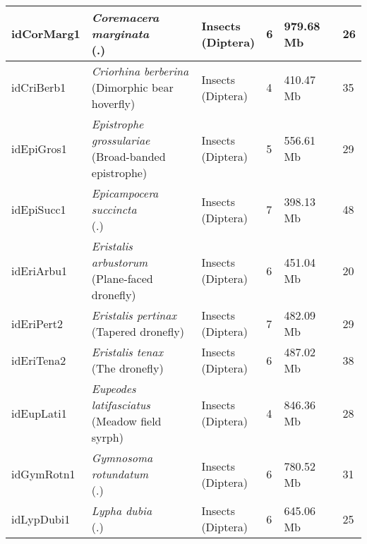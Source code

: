 \begin{centering}
\begin{longtable}{l|l|l|l|l|l}
idCorMarg1 & \makecell[{l}]{\textit{Coremacera marginata} \\ (.)} & \makecell[{l}]{Insects \\ (Diptera)} & 6 & 979.68 Mb & 26  \\ \hline
idCriBerb1 & \makecell[{l}]{\textit{Criorhina berberina} \\ (Dimorphic bear hoverfly)} & \makecell[{l}]{Insects \\ (Diptera)} & 4 & 410.47 Mb & 35  \\ \hline
idEpiGros1 & \makecell[{l}]{\textit{Epistrophe grossulariae} \\ (Broad-banded epistrophe)} & \makecell[{l}]{Insects \\ (Diptera)} & 5 & 556.61 Mb & 29  \\ \hline
idEpiSucc1 & \makecell[{l}]{\textit{Epicampocera succincta} \\ (.)} & \makecell[{l}]{Insects \\ (Diptera)} & 7 & 398.13 Mb & 48  \\ \hline
idEriArbu1 & \makecell[{l}]{\textit{Eristalis arbustorum} \\ (Plane-faced dronefly)} & \makecell[{l}]{Insects \\ (Diptera)} & 6 & 451.04 Mb & 20  \\ \hline
idEriPert2 & \makecell[{l}]{\textit{Eristalis pertinax} \\ (Tapered dronefly)} & \makecell[{l}]{Insects \\ (Diptera)} & 7 & 482.09 Mb & 29  \\ \hline
idEriTena2 & \makecell[{l}]{\textit{Eristalis tenax} \\ (The dronefly)} & \makecell[{l}]{Insects \\ (Diptera)} & 6 & 487.02 Mb & 38  \\ \hline
idEupLati1 & \makecell[{l}]{\textit{Eupeodes latifasciatus} \\ (Meadow field syrph)} & \makecell[{l}]{Insects \\ (Diptera)} & 4 & 846.36 Mb & 28  \\ \hline
idGymRotn1 & \makecell[{l}]{\textit{Gymnosoma rotundatum} \\ (.)} & \makecell[{l}]{Insects \\ (Diptera)} & 6 & 780.52 Mb & 31  \\ \hline
idLypDubi1 & \makecell[{l}]{\textit{Lypha dubia} \\ (.)} & \makecell[{l}]{Insects \\ (Diptera)} & 6 & 645.06 Mb & 25  \\ \hline

\end{longtable}
\end{centering}
